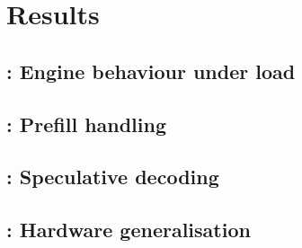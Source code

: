 \section{Results}
\label{sec:results}


\subsection{: Engine behaviour under load}
\label{sec:rq1}

\subsection{: Prefill handling}
\label{sec:rq2}
\todo{}

\subsection{: Speculative decoding}
\label{sec:rq3}
\todo{}

\subsection{: Hardware generalisation}
\label{sec:rq4}
\todo{}

